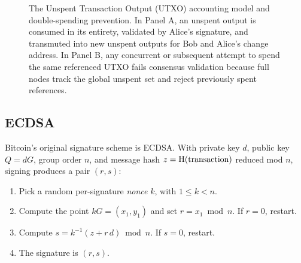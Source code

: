 \begin{figure}[H]
\caption{The Unspent Transaction Output (UTXO) accounting model and double-spending prevention. In Panel A, an unspent output is consumed in its entirety, validated by Alice's signature, and transmuted into new unspent outputs for Bob and Alice's change address. In Panel B, any concurrent or subsequent attempt to spend the same referenced UTXO fails consensus validation because full nodes track the global unspent set and reject previously spent references.}
\label{ch36:fig-utxo}
\end{figure}

\subsection{ECDSA}
\label{ch36:ecdsa}

Bitcoin's original signature scheme is ECDSA. With private key $d$, public key $Q=dG$, group order $n$, and message hash $z = \operatorname{H}(\text{transaction})$ reduced mod $n$, signing produces a pair $(r,s)$:

\begin{enumerate}
  \item Pick a random per-signature \emph{nonce} $k$, with $1 \le k < n$.
  \item Compute the point $kG = (x_1,y_1)$ and set $r = x_1 \bmod n$. If $r=0$, restart.
  \item Compute $s = k^{-1}(z + r\,d) \bmod n$. If $s=0$, restart.
  \item The signature is $(r,s)$.
\end{enumerate}

